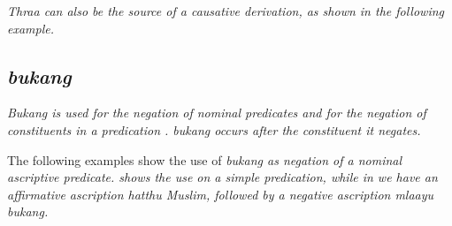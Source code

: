 \em Thraa \em can also be the source of a causative derivation, as shown in the following example.




%
%



\subsection{\em bukang\em}\label{sec:wc:bukang}
\em Bukang \em is used for the negation of nominal predicates  and for the negation of constituents in a predication . \em bukang \em occurs after the constituent it negates.



The following examples show the use of \em bukang \em as negation of a nominal ascriptive predicate.  shows the use on a simple predication, while in  we have an affirmative ascription \em hatthu Muslim\em, followed by a negative ascription \em mlaayu bukang\em.




